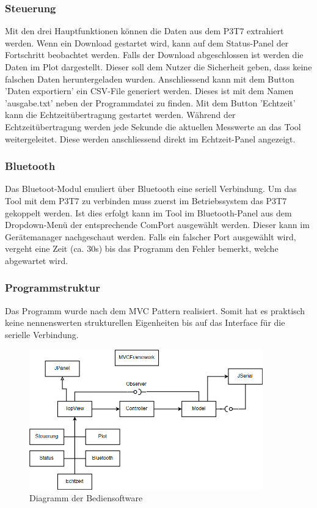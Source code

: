 \subsubsection*{Steuerung}

Mit den drei Hauptfunktionen können die Daten aus dem P3T7 extrahiert werden. Wenn ein Download gestartet wird, kann auf dem Status-Panel der Fortschritt beobachtet werden. Falls der Download abgeschlossen ist werden die Daten im Plot dargestellt. Dieser soll dem Nutzer die Sicherheit geben, dass keine falschen Daten heruntergeladen wurden. Anschliessend kann mit dem Button 'Daten exportiern' ein CSV-File generiert werden. Dieses ist mit dem Namen 'ausgabe.txt' neben der Programmdatei zu finden. Mit dem Button 'Echtzeit' kann die Echtzeitübertragung gestartet werden. Während der Echtzeitübertragung werden jede Sekunde die aktuellen Messwerte an das Tool weitergeleitet. Diese werden anschliessend direkt im Echtzeit-Panel angezeigt.

\subsubsection*{Bluetooth}

Das Bluetoot-Modul emuliert über Bluetooth eine seriell Verbindung. Um das Tool mit dem P3T7 zu verbinden muss zuerst im Betriebssystem das P3T7 gekoppelt werden.  Ist dies erfolgt kann im Tool im Bluetooth-Panel aus dem Dropdown-Menü der entsprechende ComPort ausgewählt werden. Dieser kann im Gerätemanager nachgeschaut werden. Falls ein falscher Port ausgewählt wird, vergeht eine Zeit (ca. 30s) bis das Programm den Fehler bemerkt, welche abgewartet wird.


\subsubsection*{Programmstruktur}

Das Programm wurde nach dem MVC Pattern realisiert. Somit hat es praktisch keine nennenswerten strukturellen Eigenheiten bis auf das Interface für die serielle Verbindung. 

\begin{figure}[H]
\begin{center}
\includegraphics[width=0.9\textwidth]{images/Software_UML.png}
\caption{Diagramm der Bediensoftware}
\end{center}
\end{figure}
